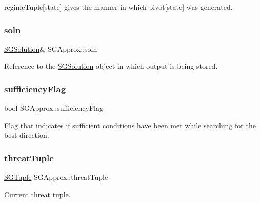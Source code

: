 regime\+Tuple\mbox{[}state\mbox{]} gives the manner in which pivot\mbox{[}state\mbox{]} was generated. \mbox{\label{classSGApprox_aaed7d16ba723bbdfbec94b21e0edff8e}} 
\subsubsection{\texorpdfstring{soln}{soln}}
{\footnotesize\ttfamily \hyperlink{classSGSolution}{S\+G\+Solution}\& S\+G\+Approx\+::soln\hspace{0.3cm}{\ttfamily [private]}}

Reference to the \hyperlink{classSGSolution}{S\+G\+Solution} object in which output is being stored. \mbox{\label{classSGApprox_ac683c5ef90b22b635d4c70861ca08887}} 
\subsubsection{\texorpdfstring{sufficiency\+Flag}{sufficiencyFlag}}
{\footnotesize\ttfamily bool S\+G\+Approx\+::sufficiency\+Flag\hspace{0.3cm}{\ttfamily [private]}}

Flag that indicates if sufficient conditions have been met while searching for the best direction. \mbox{\label{classSGApprox_a69815072fd57ec5b6b137dc839371ec7}} 
\subsubsection{\texorpdfstring{threat\+Tuple}{threatTuple}}
{\footnotesize\ttfamily \hyperlink{classSGTuple}{S\+G\+Tuple} S\+G\+Approx\+::threat\+Tuple\hspace{0.3cm}{\ttfamily [private]}}

Current threat tuple. \mbox{\label{classSGApprox_ae680fd19d6a65aecee81dffeba8e8595}} 
